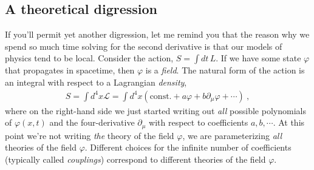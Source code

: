 \subsection{A theoretical digression}

If you'll permit yet another digression, let me remind you that the reason why we spend so much time solving for the second derivative is that our models of physics tend to be local. Consider the action, $S = \int dt \, L$. If we have some state $\varphi$ that propagates in spacetime, then $\varphi$ is a \emph{field}. The natural form of the action is an integral with respect to a Lagrangian \emph{density},
\begin{align}
	S = \int d^4x \mathcal L = \int d^4x \left(\text{const.} + a \varphi + b \partial_\mu \varphi + \cdots\right) \ ,
\end{align}
where on the right-hand side we just started writing out \emph{all} possible polynomials of $\varphi(x,t)$ and the four-derivative $\partial_\mu$ with respect to coefficients $a, b,\cdots$. At this point we're not writing \emph{the} theory of the field $\varphi$, we are parameterizing \emph{all} theories of the field $\varphi$. Different choices for the infinite number of coefficients (typically called \emph{couplings}) correspond to different theories of the field $\varphi$.

